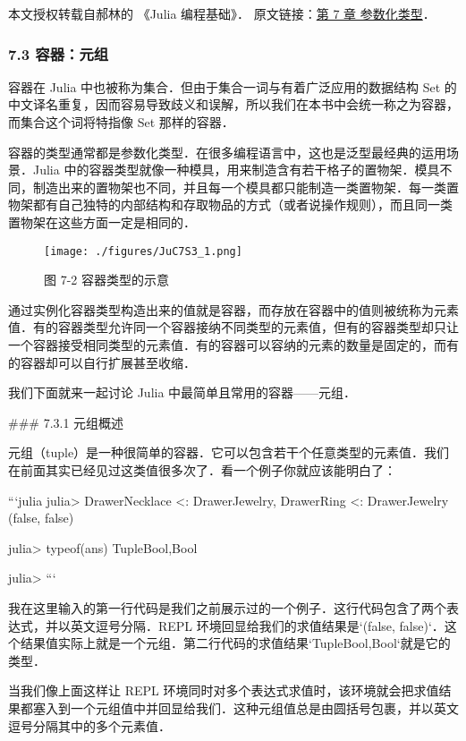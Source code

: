 
本文授权转载自郝林的 《Julia 编程基础》． 原文链接：\href{https://github.com/hyper0x/JuliaBasics/blob/master/book/ch07.md}{第 7 章 参数化类型}．


\subsubsection{7.3 容器：元组}

容器在 Julia 中也被称为集合．但由于集合一词与有着广泛应用的数据结构 Set 的中文译名重复，因而容易导致歧义和误解，所以我们在本书中会统一称之为容器，而集合这个词将特指像 Set 那样的容器．

容器的类型通常都是参数化类型．在很多编程语言中，这也是泛型最经典的运用场景．Julia 中的容器类型就像一种模具，用来制造含有若干格子的置物架．模具不同，制造出来的置物架也不同，并且每一个模具都只能制造一类置物架．每一类置物架都有自己独特的内部结构和存取物品的方式（或者说操作规则），而且同一类置物架在这些方面一定是相同的．
\begin{figure}[ht]
\centering
\texttt{[image: ./figures/JuC7S3\_1.png]}
\caption{图 7-2 容器类型的示意} \label{JuC7S3_fig1}
\end{figure}

通过实例化容器类型构造出来的值就是容器，而存放在容器中的值则被统称为元素值．有的容器类型允许同一个容器接纳不同类型的元素值，但有的容器类型却只让一个容器接受相同类型的元素值．有的容器可以容纳的元素的数量是固定的，而有的容器却可以自行扩展甚至收缩．

我们下面就来一起讨论 Julia 中最简单且常用的容器——元组．

### 7.3.1 元组概述 

元组（tuple）是一种很简单的容器．它可以包含若干个任意类型的元素值．我们在前面其实已经见过这类值很多次了．看一个例子你就应该能明白了：

```julia
julia> Drawer{Necklace} <: Drawer{Jewelry}, Drawer{Ring} <: Drawer{Jewelry}
(false, false)

julia> typeof(ans)
Tuple{Bool,Bool}

julia> 
```

我在这里输入的第一行代码是我们之前展示过的一个例子．这行代码包含了两个表达式，并以英文逗号分隔．REPL 环境回显给我们的求值结果是`(false, false)`．这个结果值实际上就是一个元组．第二行代码的求值结果`Tuple{Bool,Bool}`就是它的类型．

当我们像上面这样让 REPL 环境同时对多个表达式求值时，该环境就会把求值结果都塞入到一个元组值中并回显给我们．这种元组值总是由圆括号包裹，并以英文逗号分隔其中的多个元素值．

